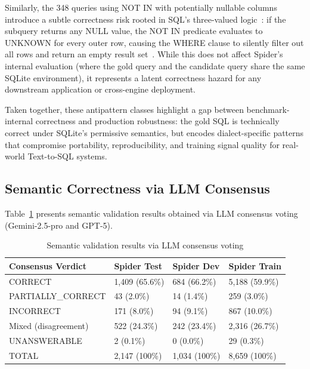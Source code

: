 \documentclass[print]{einformatica}
\begin{document}
Similarly, the 348 queries using NOT IN with potentially nullable columns introduce a subtle correctness risk rooted in SQL's three-valued logic~\cite{iso9075_2_2016}: if the subquery returns any NULL value, the NOT IN predicate evaluates to UNKNOWN for every outer row, causing the WHERE clause to silently filter out all rows and return an empty result set~\cite{karwin2010sqlantipatterns,date2012sqlrelational}. While this does not affect Spider's internal evaluation (where the gold query and the candidate query share the same SQLite environment), it represents a latent correctness hazard for any downstream application or cross-engine deployment.

Taken together, these antipattern classes highlight a gap between benchmark-internal correctness and production robustness: the gold SQL is technically correct under SQLite's permissive semantics, but encodes dialect-specific patterns that compromise portability, reproducibility, and training signal quality for real-world Text-to-SQL systems.

\subsection{Semantic Correctness via LLM Consensus}\label{sec:semantic_results}

Table~\ref{tab:semantic} presents semantic validation results obtained via LLM consensus voting (Gemini-2.5-pro and GPT-5).

\begin{table}[ht]
    \caption{Semantic validation results via LLM consensus voting}
    \label{tab:semantic}
    \centering
    \footnotesize
    \begin{tabular}{lp{}p{}p{}}
        \toprule
        \textbf{Consensus Verdict} & \textbf{Spider Test} & \textbf{Spider Dev} & \textbf{Spider Train} \\
        \midrule
        CORRECT & 1,409 (65.6\%) & 684 (66.2\%) & 5,188 (59.9\%) \\
        PARTIALLY\_CORRECT & 43 (2.0\%) & 14 (1.4\%) & 259 (3.0\%) \\
        INCORRECT & 171 (8.0\%) & 94 (9.1\%) & 867 (10.0\%) \\
        Mixed (disagreement) & 522 (24.3\%) & 242 (23.4\%) & 2,316 (26.7\%) \\
        UNANSWERABLE & 2 (0.1\%) & 0 (0.0\%) & 29 (0.3\%) \\
        TOTAL & 2,147 (100\%) & 1,034 (100\%) & 8,659 (100\%) \\
        \bottomrule
    \end{tabular}
\end{table}
\end{document}
